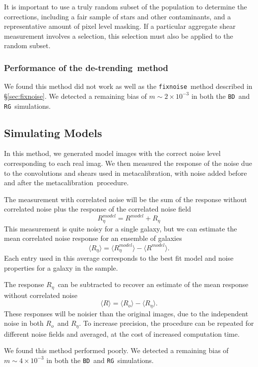 \documentclass[usegraphicx,usenatbib]{mn2e}
\newcommand{\mcal}{metacalibration}
\newcommand{\mcalR}{$R$}
\newcommand{\mcalRo}{$R_o$}
\newcommand{\mcalRnoise}{$R_\eta$}
\newcommand{\mcalRmodel}{$R^{model}$}
\newcommand{\mcalRnoisemodel}{$R^{model}_\eta$}
\newcommand{\detrend}{de-trending}
\newcommand{\fixnoise}{\texttt{fixnoise}}
\newcommand{\bdsim}{\texttt{BD}}
\newcommand{\rgsim}{\texttt{RG}}
\begin{document}
It is important to use a truly random subset of the population to determine the
corrections, including a fair sample of stars and other contaminants, and a
representative amount of pixel level masking.  If a particular aggregate shear
measurement involves a selection, this selection must also be applied to the
random subset.

\subsubsection{Performance of the \detrend\ method}

We found this method did not work as well as the \fixnoise\ method
described in \S \ref{sec:fixnoise}.  We detected a remaining bias
of $m \sim 2 \times 10^{-3}$ in both the \bdsim\ and \rgsim\ simulations.

\subsection{Simulating Models}

In this method, we generated model images with the correct noise level corresponding
to each real imag.  We then measured the response of the noise due to the
convolutions and shears used in \mcal, with noise added before and
after the \mcal\ procedure.

The measurement with correlated noise will be the sum of the response
without correlated noise plus the response of the correlated noise field
\begin{equation}
    \mbox{\mcalRnoisemodel} = \mbox{\mcalRmodel} + \mbox{\mcalRnoise}
\end{equation}
This measurement is quite noisy for a single galaxy, but we
can estimate the mean correlated noise response for an ensemble
of galaxies
\begin{equation}
    \langle \mbox{\mcalRnoise} \rangle = \langle \mbox{\mcalRnoisemodel} \rangle - \langle \mbox{\mcalRmodel} \rangle.
\end{equation}
Each entry used in this average corresponds to the best fit model
and noise properties for a galaxy in the sample.

The response \mcalRnoise\ can be subtracted to recover an estimate of the mean
response without correlated noise
\begin{equation}
    \langle \mbox{\mcalR} \rangle = \langle \mbox{\mcalRo} \rangle - \langle \mbox{\mcalRnoise} \rangle.
\end{equation}
These responses will be noisier than the original images, due to the
independent noise in both \mcalRo\ and \mcalRnoise.  To increase
precision, the procedure can be repeated for different noise fields
and averaged, at the cost of increased computation time.

We found this method performed poorly.  We detected a remaining bias of  $m
\sim 4 \times 10^{-3}$ in both the \bdsim\ and \rgsim\ simulations.




\end{document}
